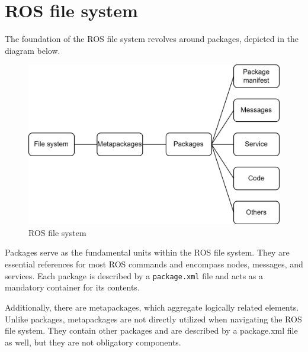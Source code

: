 \section{ROS file system}

The foundation of the ROS file system revolves around packages, depicted in the diagram below. 
\begin{figure}[H]
    \centering
    \includegraphics[width=0.75\linewidth]{images/fs.png}
    \caption{ROS file system}
\end{figure}
Packages serve as the fundamental units within the ROS file system. 
They are essential references for most ROS commands and encompass nodes, messages, and services. 
Each package is described by a \texttt{package.xml} file and acts as a mandatory container for its contents.

Additionally, there are metapackages, which aggregate logically related elements. 
Unlike packages, metapackages are not directly utilized when navigating the ROS file system. 
They contain other packages and are described by a package.xml file as well, but they are not obligatory components.